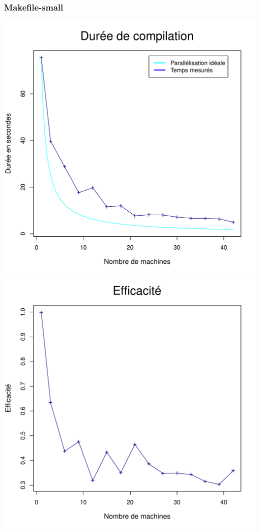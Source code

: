 \documentclass[a4paper, 11pt, titlepage]{article}
\begin{document}
\subsubsection* {Makefile-small}

\begin{center}
    \includegraphics[scale=0.45]{res/sujet_makefiles_premier_Makefile-small_nth1.pdf}
    \includegraphics[scale=0.45]{res/sujet_makefiles_premier_Makefile-small_nth1_eff.pdf}

\end{center}
\end{document}
